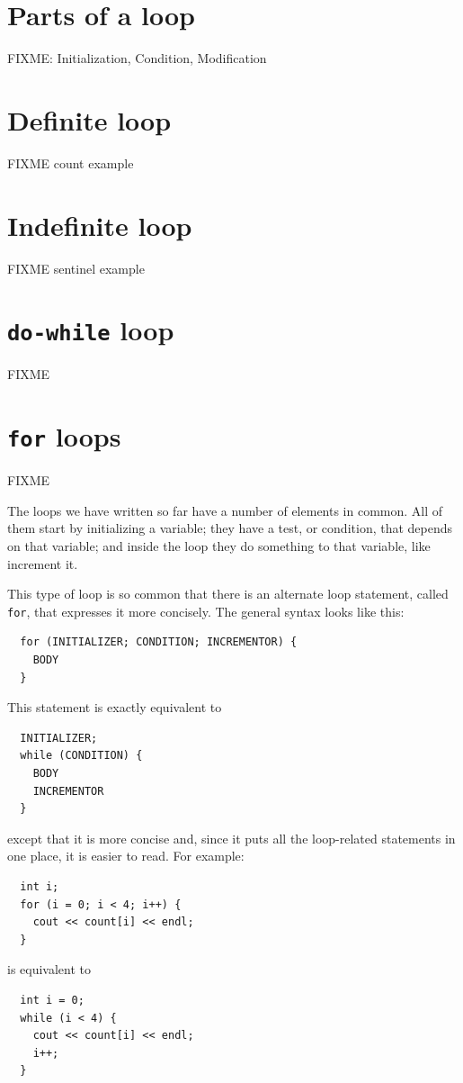 \section{Parts of a loop}
FIXME: Initialization, Condition, Modification
\section{Definite loop}
FIXME count example
\section{Indefinite loop}
FIXME sentinel example

\section{{\tt do-while} loop}
FIXME

\section{{\tt for} loops}
FIXME

The loops we have written so far have a number of elements
in common.  All of them start by initializing a variable;
they have a test, or condition, that depends on that variable;
and inside the loop they do something to that variable,
like increment it.


This type of loop is so common that there is an alternate
loop statement, called {\tt for}, that expresses it more
concisely.  The general syntax looks like this:

\begin{verbatim}
  for (INITIALIZER; CONDITION; INCREMENTOR) {
    BODY
  }
\end{verbatim}
%
This statement is exactly equivalent to

\begin{verbatim}
  INITIALIZER;
  while (CONDITION) {
    BODY
    INCREMENTOR
  }
\end{verbatim}
%
except that it is more concise and, since it puts all the
loop-related statements in one place, it is easier to read.
For example:

\begin{verbatim}
  int i;
  for (i = 0; i < 4; i++) {
    cout << count[i] << endl;
  }
\end{verbatim}
%
is equivalent to 

\begin{verbatim}
  int i = 0;
  while (i < 4) {
    cout << count[i] << endl;
    i++;
  }
\end{verbatim}

